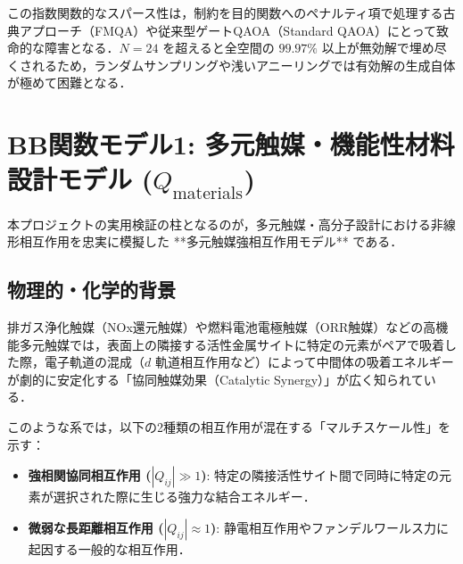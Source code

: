 \documentclass[11pt,a4paper]{ltjsarticle}
\begin{document}
この指数関数的なスパース性は，制約を目的関数へのペナルティ項で処理する古典アプローチ（FMQA）や従来型ゲートQAOA（Standard QAOA）にとって致命的な障害となる．$N=24$ を超えると全空間の $99.97\%$ 以上が無効解で埋め尽くされるため，ランダムサンプリングや浅いアニーリングでは有効解の生成自体が極めて困難となる．

\section{BB関数モデル1: 多元触媒・機能性材料設計モデル (\texorpdfstring{$Q_{\mathrm{materials}}$}{Q\_materials})}
\label{sec:model_materials}
本プロジェクトの実用検証の柱となるのが，多元触媒・高分子設計における非線形相互作用を忠実に模擬した **多元触媒強相互作用モデル** である．

\subsection{物理的・化学的背景}
排ガス浄化触媒（NOx還元触媒）や燃料電池電極触媒（ORR触媒）などの高機能多元触媒では，表面上の隣接する活性金属サイトに特定の元素がペアで吸着した際，電子軌道の混成（$d$ 軌道相互作用など）によって中間体の吸着エネルギーが劇的に安定化する「協同触媒効果（Catalytic Synergy）」が広く知られている．

このような系では，以下の2種類の相互作用が混在する「マルチスケール性」を示す：
\begin{itemize}\setlength{\itemsep}{2pt}
    \item \textbf{強相関協同相互作用 ($|Q_{ij}| \gg 1$)}: 特定の隣接活性サイト間で同時に特定の元素が選択された際に生じる強力な結合エネルギー．
    \item \textbf{微弱な長距離相互作用 ($|Q_{ij}| \approx 1$)}: 静電相互作用やファンデルワールス力に起因する一般的な相互作用．
\end{itemize}
\end{document}
